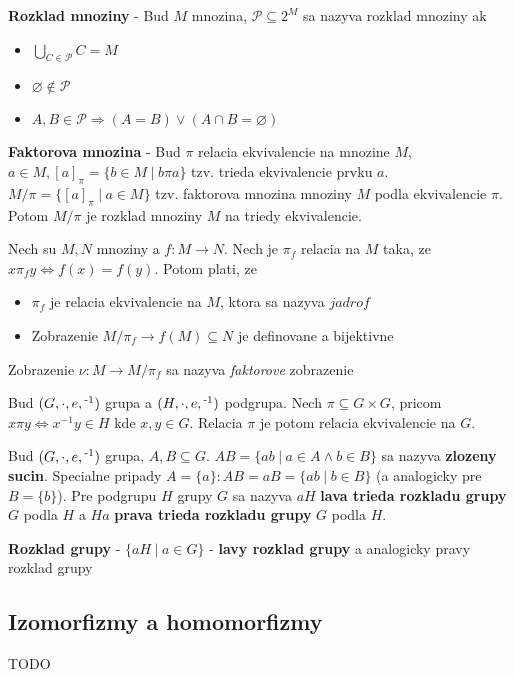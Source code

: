 \documentclass[12pt]{article}
\newcommand{\pipesep}{\hspace{3pt} \vert \hspace{3pt}}
\begin{document}
\textbf{Rozklad mnoziny} - Bud $M$ mnozina, $\mathcal{P} \subseteq 2^{M}$ sa nazyva rozklad mnoziny ak
\begin{itemize}
	\item $\bigcup_{C \in \mathcal{P}} C = M$
	\item $\varnothing \not\in \mathcal{P}$
	\item $A,B \in \mathcal{P} \Rightarrow (A = B) \lor (A \cap B = \varnothing)$
\end{itemize}

\textbf{Faktorova mnozina} - Bud $\pi$ relacia ekvivalencie na mnozine $M$, $a \in M, [a]_{\pi} = \{b \in M \pipesep b\pi a\}$
tzv. trieda ekvivalencie prvku $a$. $M/\pi = \{[a]_{\pi} \pipesep a \in M\}$ tzv. faktorova mnozina mnoziny $M$ podla ekvivalencie
$\pi$. Potom $M/\pi$ je rozklad mnoziny $M$ na triedy ekvivalencie.

\newpage
Nech su $M,N$ mnoziny a $f: M \to N$. Nech je $\pi_{f}$ relacia na $M$ taka, ze
$x\pi_{f}y \Leftrightarrow f(x) = f(y)$. Potom plati, ze
\begin{itemize}
	\item $\pi_{f}$ je relacia ekvivalencie na $M$, ktora sa nazyva $jadro f$
	\item Zobrazenie $M/\pi_{f} \to f(M) \subseteq N$ je definovane a bijektivne
\end{itemize}
Zobrazenie $\nu: M \to M/\pi_{f}$ sa nazyva \emph{faktorove} zobrazenie

\vspace{0.5cm}

Bud $(G,\cdot,e,\textsuperscript{-1})$ grupa a $(H,\cdot,e,\textsuperscript{-1})$ podgrupa.
Nech $\pi \subseteq G \times G$, pricom $x\pi y \Leftrightarrow x^{-1}y \in H$ kde $x,y \in G$.
Relacia $\pi$ je potom relacia ekvivalencie na $G$.

Bud $(G,\cdot,e,\textsuperscript{-1})$ grupa, $A,B \subseteq G$. $AB = \{ab \pipesep a \in A \land b \in B\}$
sa nazyva \textbf{zlozeny sucin}. Specialne pripady $A = \{a\}: AB = aB = \{ab \pipesep b \in B\}$ (a analogicky
pre $B = \{b\}$). Pre podgrupu $H$ grupy $G$ sa nazyva $aH$ \textbf{lava trieda rozkladu grupy} $G$ podla $H$ a
$Ha$ \textbf{prava trieda rozkladu grupy} $G$ podla $H$.

\textbf{Rozklad grupy} - $\{aH \pipesep a \in G\}$ - \textbf{lavy rozklad grupy} a analogicky pravy rozklad grupy

\subsection{Izomorfizmy a homomorfizmy}
TODO
\end{document}
